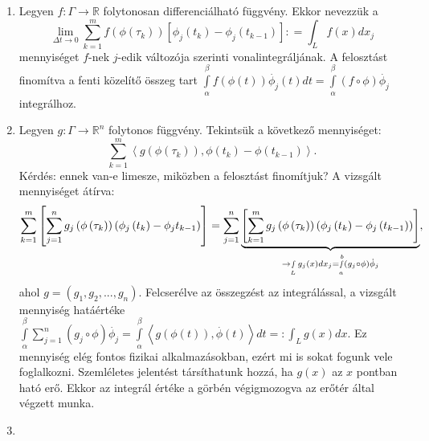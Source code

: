 \documentclass[12pt,a4paper]{scrartcl}
\providecommand{\tightlist}{%
  \setlength{\itemsep}{0pt}\setlength{\parskip}{0pt}}
\begin{document}
\begin{enumerate}
\def\labelenumi{\arabic{enumi}.}
\tightlist
\item
  Legyen \(\left. f:\Gamma\rightarrow{\mathbb{R}} \right.\) folytonosan
  differenciálható függvény. Ekkor nevezzük a
  \[\lim\limits_{\Delta t\rightarrow 0}{\sum\limits_{k = 1}^{m}{f\left( {\phi\left( \tau_{k} \right)} \right)\left\lbrack {\phi_{j}\left( t_{k} \right) - \phi_{j}\left( t_{k - 1} \right)} \right\rbrack}}: = {\int_{L}{f\left( x \right)dx_{j}}}\]
  mennyiséget \(f\)-nek \(j\)-edik változója szerinti
  vonalintegráljának. A felosztást finomítva a fenti közelítő összeg
  tart
  \({\int\limits_{\alpha}^{\beta}{f\left( {\phi\left( t \right)} \right){\overset{.}{\phi}}_{j}\left( t \right)dt}} = {\int\limits_{\alpha}^{\beta}{\left( {f \circ \phi} \right){\overset{.}{\phi}}_{j}}}\)
  integrálhoz.
\item
  Legyen \(\left. g:\Gamma\rightarrow{\mathbb{R}}^{n} \right.\)
  folytonos függvény. Tekintsük a következő mennyiséget:
  \[\sum\limits_{k = 1}^{m}{\left\langle {g\left( {\phi\left( \tau_{k} \right)} \right),\phi\left( t_{k} \right) - \phi\left( t_{k - 1} \right)} \right\rangle.}\]Kérdés:
  ennek van-e limesze, miközben a felosztást finomítjuk? A vizsgált
  mennyiséget átírva:
  \[\mathop \sum \limits_{k = 1}^m \left[ {\mathop \sum \limits_{j = 1}^n {g_j}\left( {\phi \left( {{\tau _k}} \right)} \right)\left( {{\phi _j}\left( {{t_k}} \right) - {\phi _j}{t_{k - 1}}} \right)} \right] = \mathop \sum \limits_{j = 1}^n \underbrace {\left[ {\mathop \sum \limits_{k = 1}^m {g_j}\left( {\phi \left( {{\tau _k}} \right)} \right)\left( {{\phi _j}\left( {{t_k}} \right) - {\phi _j}\left( {{t_{k - 1}}} \right)} \right)} \right]}_{ \to \mathop \smallint \limits_L {g_j}\left( x \right)d{x_j} = \mathop \smallint \limits_a^b \left( {{g_j} \circ \phi } \right){{\dot \phi }_j}},\]
  ahol \(g = \left( {g_{1},g_{2},...,g_{n}} \right)\). Felcserélve az
  összegzést az integrálással, a vizsgált mennyiség hatáértéke
  \({\int\limits_{\alpha}^{\beta}{\sum\limits_{j = 1}^{n}{\left( {g_{j} \circ \phi} \right){\overset{.}{\phi}}_{j}}}} = {\int\limits_{\alpha}^{\beta}{\left\langle {g\left( {\phi\left( t \right)} \right),\overset{.}{\phi}\left( t \right)} \right\rangle dt = :{\int_{L}{g\left( x \right)dx}}}}\).
  Ez mennyiség elég fontos fizikai alkalmazásokban, ezért mi is sokat
  fogunk vele foglalkozni. Szemléletes jelentést társíthatunk hozzá, ha
  \(g\left( x \right)\) az \(x\) pontban ható erő. Ekkor az integrál
  értéke a görbén végigmozogva az erőtér által végzett munka.
\item

\end{enumerate}
\end{document}
